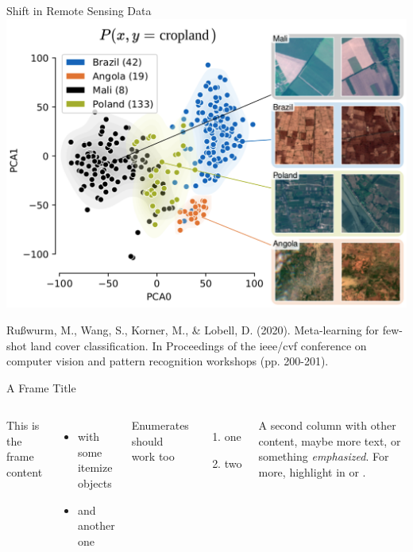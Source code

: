 \documentclass[11pt]{beamer}
\newcommand{\citeapa}[1]{ {\tiny#1\par} }
\begin{document}
	\begin{frame}{Shift in Remote Sensing Data}
		\includegraphics[width=.9\textwidth]{images/Sen12ms_distribution_shift}
		
		\citeapa{Rußwurm, M., Wang, S., Korner, M., \& Lobell, D. (2020). Meta-learning for few-shot land cover classification. In Proceedings of the ieee/cvf conference on computer vision and pattern recognition workshops (pp. 200-201).}
	\end{frame}
	
	
	\begin{frame}{A Frame Title}
		
		\begin{columns}
			
			
			This is the frame content
			\begin{itemize}
				\item with some itemize objects
				\item and another one
			\end{itemize}
			
			Enumerates should work too
			\begin{enumerate}
				\item one
				\item two
			\end{enumerate}
		
			
			A second column with other content, maybe more text, or something \emph{emphasized}. For more, highlight in  or .
			
			
			
		\end{columns}
		
	\end{frame}
\end{document}
